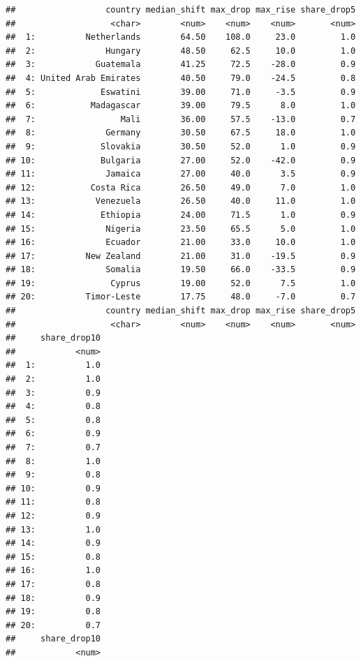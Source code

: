 \documentclass[
  11pt,
]{article}
\begin{document}
\begin{verbatim}
##                  country median_shift max_drop max_rise share_drop5
##                   <char>        <num>    <num>    <num>       <num>
##  1:          Netherlands        64.50    108.0     23.0         1.0
##  2:              Hungary        48.50     62.5     10.0         1.0
##  3:            Guatemala        41.25     72.5    -28.0         0.9
##  4: United Arab Emirates        40.50     79.0    -24.5         0.8
##  5:             Eswatini        39.00     71.0     -3.5         0.9
##  6:           Madagascar        39.00     79.5      8.0         1.0
##  7:                 Mali        36.00     57.5    -13.0         0.7
##  8:              Germany        30.50     67.5     18.0         1.0
##  9:             Slovakia        30.50     52.0      1.0         0.9
## 10:             Bulgaria        27.00     52.0    -42.0         0.9
## 11:              Jamaica        27.00     40.0      3.5         0.9
## 12:           Costa Rica        26.50     49.0      7.0         1.0
## 13:            Venezuela        26.50     40.0     11.0         1.0
## 14:             Ethiopia        24.00     71.5      1.0         0.9
## 15:              Nigeria        23.50     65.5      5.0         1.0
## 16:              Ecuador        21.00     33.0     10.0         1.0
## 17:          New Zealand        21.00     31.0    -19.5         0.9
## 18:              Somalia        19.50     66.0    -33.5         0.9
## 19:               Cyprus        19.00     52.0      7.5         1.0
## 20:          Timor-Leste        17.75     48.0     -7.0         0.7
##                  country median_shift max_drop max_rise share_drop5
##                   <char>        <num>    <num>    <num>       <num>
##     share_drop10
##            <num>
##  1:          1.0
##  2:          1.0
##  3:          0.9
##  4:          0.8
##  5:          0.8
##  6:          0.9
##  7:          0.7
##  8:          1.0
##  9:          0.8
## 10:          0.9
## 11:          0.8
## 12:          0.9
## 13:          1.0
## 14:          0.9
## 15:          0.8
## 16:          1.0
## 17:          0.8
## 18:          0.9
## 19:          0.8
## 20:          0.7
##     share_drop10
##            <num>
\end{verbatim}
\end{document}
